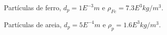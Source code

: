 \documentclass{beamer}
\begin{document}
\begin{frame}
  \begin{minipage}{.48\textwidth}
    \begin{figure}
       {\raggedleft \tiny Partículas de ferro, $d_p=1E^{-3}m$ e $\rho_{Fe}=7.3E^{3}kg/m^3$.}
    \end{figure}
  \end{minipage}
  \hfill
  \begin{minipage}{.48\textwidth}
    \begin{figure}
       {\raggedleft \tiny Partículas de areia, $d_p=5E^{-4}m$ e $\rho_p=1.6E^{3}kg/m^3$.}
    \end{figure}
  \end{minipage}
\end{frame}

\end{document}
